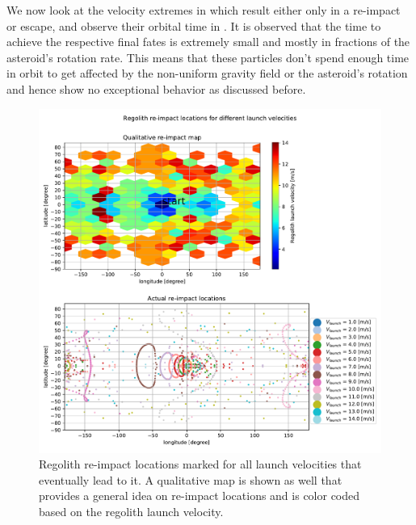 %
\newline\newline
%
We now look at the velocity extremes in  which result either only in a re-impact or escape, and observe their orbital time in . It is observed that the time to achieve the respective final fates is extremely small and mostly in fractions of the asteroid's rotation rate. This means that these particles don't spend enough time in orbit to get affected by the non-uniform gravity field or the asteroid's rotation and hence show no exceptional behavior as discussed before.
\begin{figure}[htb]
\centering
\captionsetup{justification=centering}
\includegraphics[width=\textwidth, height=0.6\textheight, keepaspectratio=true]{Images/longest_edge_no_perturbations/crash_map_all_velocities.pdf}
\caption{Regolith re-impact locations marked for all launch velocities that eventually lead to it. A qualitative map is shown as well that provides a general idea on re-impact locations and is color coded based on the regolith launch velocity.}
\label{fig:crashmap_all_noSP}
\end{figure}
\FloatBarrier

